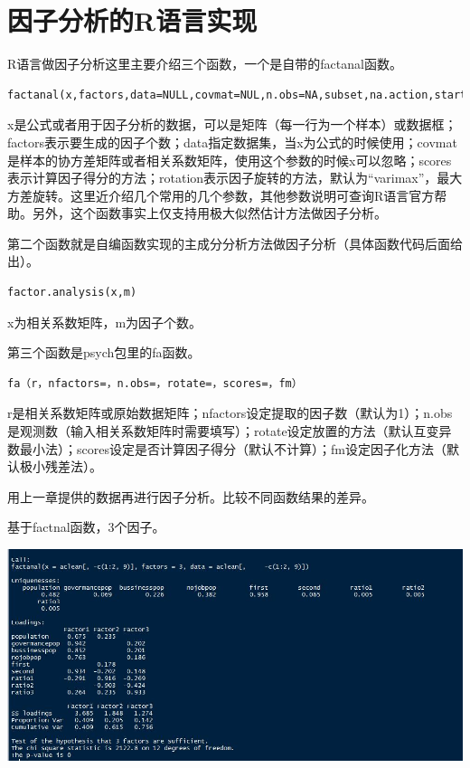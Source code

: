\documentclass[]{ctexbook}
\begin{document}
\hypertarget{ux56e0ux5b50ux5206ux6790ux7684rux8bedux8a00ux5b9eux73b0}{%
\section{因子分析的R语言实现}\label{ux56e0ux5b50ux5206ux6790ux7684rux8bedux8a00ux5b9eux73b0}}

R语言做因子分析这里主要介绍三个函数，一个是自带的factanal函数。

\begin{verbatim}
factanal(x,factors,data=NULL,covmat=NUL,n.obs=NA,subset,na.action,start=NULL,score=c("none","regression","Bartlett"),rotation="varimax",control=NULL,…)
\end{verbatim}

x是公式或者用于因子分析的数据，可以是矩阵（每一行为一个样本）或数据框；factors表示要生成的因子个数；data指定数据集，当x为公式的时候使用；covmat是样本的协方差矩阵或者相关系数矩阵，使用这个参数的时候x可以忽略；scores表示计算因子得分的方法；rotation表示因子旋转的方法，默认为``varimax''，最大方差旋转。这里近介绍几个常用的几个参数，其他参数说明可查询R语言官方帮助。另外，这个函数事实上仅支持用极大似然估计方法做因子分析。

第二个函数就是自编函数实现的主成分分析方法做因子分析（具体函数代码后面给出）。

\begin{verbatim}
factor.analysis(x,m)
\end{verbatim}

x为相关系数矩阵，m为因子个数。

第三个函数是psych包里的fa函数。

\begin{verbatim}
fa（r，nfactors=，n.obs=，rotate=，scores=，fm）
\end{verbatim}

r是相关系数矩阵或原始数据矩阵；nfactors设定提取的因子数（默认为1）；n.obs是观测数（输入相关系数矩阵时需要填写）；rotate设定放置的方法（默认互变异数最小法）；scores设定是否计算因子得分（默认不计算）；fm设定因子化方法（默认极小残差法）。

用上一章提供的数据再进行因子分析。比较不同函数结果的差异。

基于factnal函数，3个因子。

\includegraphics[width=0.6\linewidth,height=0.35\textheight]{fig/fig39}
\end{document}
